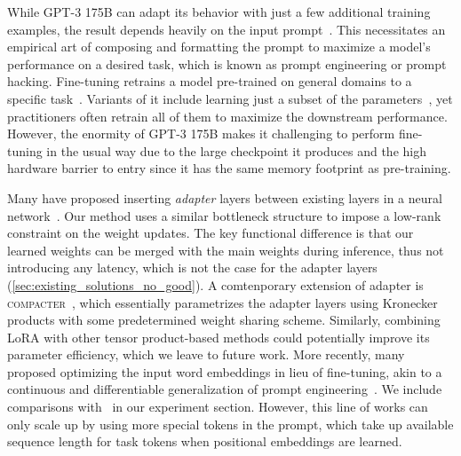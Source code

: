 While GPT-3 175B can adapt its behavior with just a few additional training examples, the result depends heavily on the input prompt~\citep{brown_language_2020}.
This necessitates an empirical art of composing and formatting the prompt to maximize a model's performance on a desired task, which is known as prompt engineering or prompt hacking.
Fine-tuning retrains a model pre-trained on general domains to a specific task~\cite{devlin_bert_2019,radford_improving_nodate}.
Variants of it include learning just a subset of the parameters~\cite{devlin_bert_2019,collobert_unified_2008}, yet practitioners often retrain all of them to maximize the downstream performance.
However, the enormity of GPT-3 175B makes it challenging to perform fine-tuning in the usual way due to the large checkpoint it produces and the high hardware barrier to entry since it has the same memory footprint as pre-training.



Many have proposed inserting \textit{adapter} layers between existing layers in a neural network~\citep{houlsby_parameter-efficient_2019, rebuffi_learning_2017,lin-etal-2020-exploring}.
Our method uses a similar bottleneck structure to impose a low-rank constraint on the weight updates.
The key functional difference is that our learned weights can be merged with the main weights during inference, thus not introducing any latency, which is not the case for the adapter layers (\autoref{sec:existing_solutions_no_good}).
A comtenporary extension of adapter is \textsc{compacter}~\citep{mahabadi2021compacter}, which essentially parametrizes the adapter layers using Kronecker products with some predetermined weight sharing scheme.
Similarly, combining LoRA with other tensor product-based methods could potentially improve its parameter efficiency, which we leave to future work.
More recently, many proposed optimizing the input word embeddings in lieu of fine-tuning, akin to a continuous and differentiable generalization of prompt engineering~\citep{li_prefix-tuning_2021, lester_power_2021, hambardzumyan_warp_2020, liu_gpt_2021}.
We include comparisons with~\citet{li_prefix-tuning_2021} in our experiment section.
However, this line of works can only scale up by using more special tokens in the prompt, which take up available sequence length for task tokens when positional embeddings are learned.







